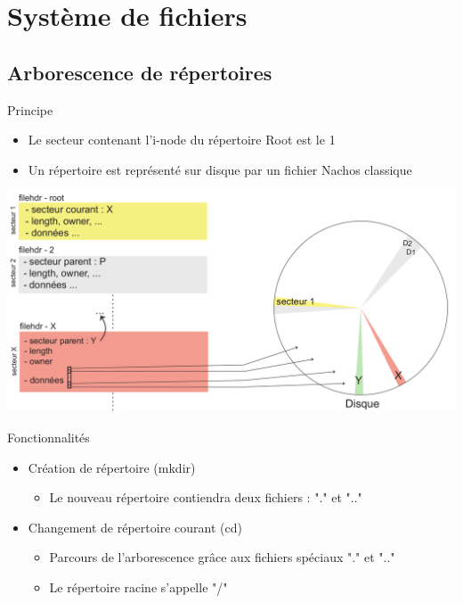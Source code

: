 \documentclass{beamer}
\begin{document}
\section{Système de fichiers}
\subsection{Arborescence de répertoires}
\begin{frame}
  \begin{block}{Principe}
  	\begin{itemize}%
  		\item Le secteur contenant l'i-node du répertoire Root est le 1
  		\item Un répertoire est représenté sur disque par un fichier Nachos classique
  	\end{itemize}  
  \end{block}
  \begin{center}
	  \includegraphics[scale=0.2]{images/FS1.png}
  \end{center}
\end{frame}

\begin{frame}
  \begin{block}{Fonctionnalités}
  	\begin{itemize}[<+->]
  		\item Création de répertoire (mkdir)
  		\begin{itemize}
  			\item Le nouveau répertoire contiendra deux fichiers : "." et ".."
  		\end{itemize}
  		\item Changement de répertoire courant (cd)
  		\begin{itemize}
  			\item Parcours de l'arborescence grâce aux fichiers spéciaux "." et ".."
  			\item Le répertoire racine s'appelle "/"
  		\end{itemize}
  	\end{itemize}
  \end{block}
\end{frame}
\end{document}

